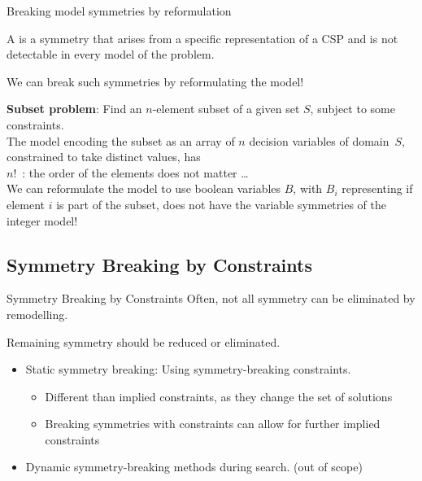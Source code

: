 \documentclass{cons-beamer}
\begin{document}
\begin{frame}{Breaking model symmetries by reformulation}
  \begin{definition}[recap]
    A  is a symmetry that arises from a specific representation of a CSP and is not detectable in every model of the problem. 
  \end{definition}
  \vfill  

  We can break such symmetries by reformulating the model!
  \vfill

  \begin{example}
  	\small
    \textbf{Subset problem}: Find an $n$-element subset of a given set $S$, subject to some
    constraints. 
    \\[+5pt]  
    The model encoding the subset as an
    array of $n$ decision variables of domain~$S$, constrained to take
    distinct values, has \\  $n!$~: the
    order of the elements does not matter \dots
    \\[+5pt]  
    We can reformulate the model to use boolean variables $B$, with $B_i$ representing if element $i$ is part of the subset, does not have the variable symmetries of the integer model! 
  \end{example}
\end{frame}


\subsection{Symmetry Breaking by Constraints}

\begin{frame}{Symmetry Breaking by Constraints}
  Often, not all symmetry can be eliminated by remodelling.
  \vfill

  Remaining symmetry should be reduced or eliminated.
  \vfill

  \begin{itemize}
    \item Static symmetry breaking: Using symmetry-breaking constraints.
      \begin{itemize}
        \item Different than implied constraints, as they \alert{change the set of solutions}
        \item Breaking symmetries with constraints can allow for further implied constraints
      \end{itemize}
      \vfill
    \item Dynamic symmetry-breaking methods during search. (out of scope)
  \end{itemize}
\end{frame}
\end{document}
